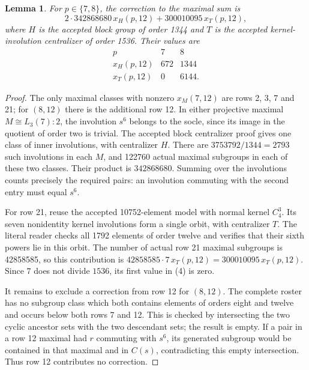 \documentclass[11pt,a4paper]{article}
\newtheorem{lemma}{Lemma}\newtheorem{theorem}{Theorem}
\begin{document}
\begin{lemma}
For $p\in\{7,8\}$, the correction to the maximal sum is
\[
            2\cdot342868680\,x_H(p,12)
                     +300010095\,x_T(p,12),                   \tag{3}
\]
where $H$ is the accepted block group of order 1344 and $T$ is the
accepted kernel-involution centralizer of order 1536. Their values are
\[
\begin{array}{c|rr}
p&7&8\\\hline
x_H(p,12)&672&1344\\
x_T(p,12)&0&6144.
\end{array}                                                     \tag{4}
\]
\end{lemma}
\begin{proof}
The only maximal classes with nonzero $x_M(7,12)$ are rows 2, 3, 7
and 21; for $(8,12)$ there is the additional row 12. In either
projective maximal $M\cong L_3(7):2$, the involution $s^6$ belongs
to the socle, since its image in the quotient of order two is trivial.
The accepted block centralizer proof gives one class of inner
involutions, with centralizer $H$. There are $3753792/1344=2793$
such involutions in each $M$, and 122760 actual maximal subgroups in
each of these two classes. Their product is $342868680$.
Summing over the involutions counts precisely the required pairs:
an involution commuting with the second entry must equal $s^6$.

For row 21, reuse the accepted 10752-element model with normal kernel
$C_4^3$. Its seven nonidentity kernel involutions form a single orbit,
with centralizer $T$. The literal reader checks all 1792 elements of
order twelve and verifies that their sixth powers lie in this orbit.
The number of actual row 21 maximal subgroups is 42858585, so this
contribution is $42858585\cdot7\,x_T(p,12)=300010095\,x_T(p,12)$.
Since $7$ does not divide $1536$, its first value in (4) is zero.

It remains to exclude a correction from row 12 for $(8,12)$.
The complete roster has no subgroup class which both contains
elements of orders eight and twelve and occurs below both rows
7 and 12. This is checked by intersecting the two cyclic ancestor
sets with the two descendant sets; the result is empty. If a pair
in a row 12 maximal had $r$ commuting with $s^6$, its generated
subgroup would be contained in that maximal and in $C(s)$, contradicting
this empty intersection. Thus row 12 contributes no correction.
\end{proof}
\end{document}

